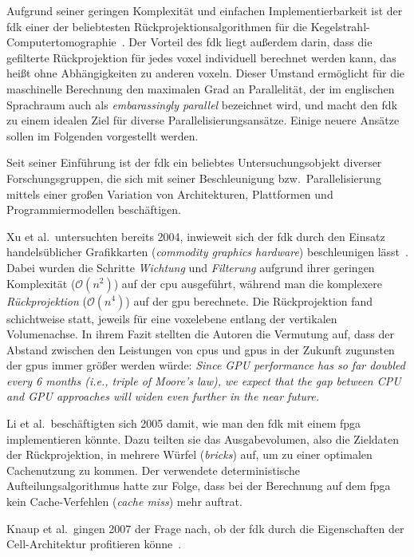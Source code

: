 Aufgrund seiner geringen Komplexität und einfachen Implementierbarkeit ist der \gls{fdk} einer der beliebtesten
Rückprojektionsalgorithmen für die Kegelstrahl-Computertomographie~\cite{xumuell}. Der Vorteil des \gls{fdk} liegt
außerdem darin, dass die gefilterte Rückprojektion für jedes \gls{voxel} individuell berechnet werden kann, das heißt
ohne Abhängigkeiten zu anderen \gls{voxel}n. Dieser Umstand ermöglicht für die maschinelle Berechnung den maximalen Grad
an Parallelität, der im englischen Sprachraum auch als \textit{embarassingly parallel} bezeichnet wird, und macht den
\gls{fdk} zu einem idealen Ziel für diverse Parallelisierungsansätze. Einige neuere Ansätze sollen im Folgenden
vorgestellt werden.

Seit seiner Einführung ist der \gls{fdk} ein beliebtes Untersuchungsobjekt diverser Forschungsgruppen, die sich mit
seiner Beschleunigung bzw.\ Parallelisierung mittels einer großen Variation von Architekturen, Plattformen und
Programmiermodellen beschäftigen. 

Xu et al.\ untersuchten bereits 2004, inwieweit sich der \gls{fdk} durch den Einsatz handelsüblicher Grafikkarten
(\textit{commodity graphics hardware}) beschleunigen lässt~\cite{xumuell}. Dabei wurden die Schritte \textit{Wichtung}
und \textit{Filterung} aufgrund ihrer geringen Komplexität ($\mathcal{O}(n^2)$) auf der \gls{cpu} ausgeführt, während
man die komplexere \textit{Rückprojektion} ($\mathcal{O}(n^4)$) auf der \gls{gpu} berechnete. Die Rückprojektion fand
schichtweise statt, jeweils für eine \gls{voxel}ebene entlang der vertikalen Volumenachse. In ihrem Fazit stellten die
Autoren die Vermutung auf, dass der Abstand zwischen den Leistungen von \gls{cpu}s und \gls{gpu}s in der Zukunft
zugunsten der \gls{gpu}s immer größer werden würde: \textit{Since GPU performance has so far doubled every 6 months 
(i.e., triple of Moore's law), we expect that the gap between CPU and GPU approaches will widen even further in the near
future.}

Li et al.\ beschäftigten sich 2005 damit, wie man den \gls{fdk} mit einem \gls{fpga} implementieren könnte. Dazu teilten
sie das Ausgabevolumen, also die Zieldaten der Rückprojektion, in mehrere Würfel (\textit{bricks}) auf, um zu einer
optimalen Cachenutzung zu kommen. Der verwendete deterministische Aufteilungsalgorithmus hatte zur Folge, dass bei der
Berechnung auf dem \gls{fpga} kein Cache-Verfehlen (\textit{cache miss}) mehr auftrat.

Knaup et al.\ gingen 2007 der Frage nach, ob der \gls{fdk} durch die Eigenschaften der Cell-Architektur profitieren
könne~\cite{knaupsteck}.

